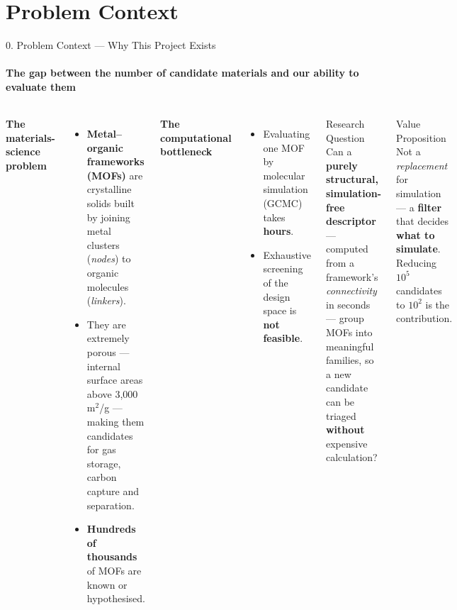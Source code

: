 \documentclass[aspectratio=169, 11pt]{beamer}
\begin{document}
\section{Problem Context}
\begin{frame}{0. Problem Context --- Why This Project Exists}
\framesubtitle{The gap between the number of candidate materials and our ability to evaluate them}
\begin{columns}[T]
\textbf{The materials-science problem}
\begin{itemize}\footnotesize
  \item \textbf{Metal--organic frameworks (MOFs)} are crystalline solids built by joining
        metal clusters (\textit{nodes}) to organic molecules (\textit{linkers}).
  \item They are extremely porous --- internal surface areas above
        3{,}000\,m$^2$/g --- making them candidates for gas storage, carbon capture and
        separation.
  \item \textbf{Hundreds of thousands} of MOFs are known or hypothesised.
\end{itemize}

\vspace{0.15cm}
\textbf{The computational bottleneck}
\begin{itemize}\footnotesize
  \item Evaluating one MOF by molecular simulation (GCMC) takes \textbf{hours}.
  \item Exhaustive screening of the design space is \textbf{not feasible}.
\end{itemize}

\begin{block}{\footnotesize Research Question}
\footnotesize
Can a \textbf{purely structural, simulation-free descriptor} --- computed from a framework's
\textit{connectivity} in seconds --- group MOFs into meaningful families, so a new candidate
can be triaged \textbf{without} expensive calculation?
\end{block}

\vspace{0.1cm}
\begin{block}{\footnotesize Value Proposition}
\footnotesize
Not a \textit{replacement} for simulation --- a \textbf{filter} that decides
\textbf{what to simulate}. Reducing $10^5$ candidates to $10^2$ is the contribution.
\end{block}
\end{columns}
\end{frame}
\end{document}
